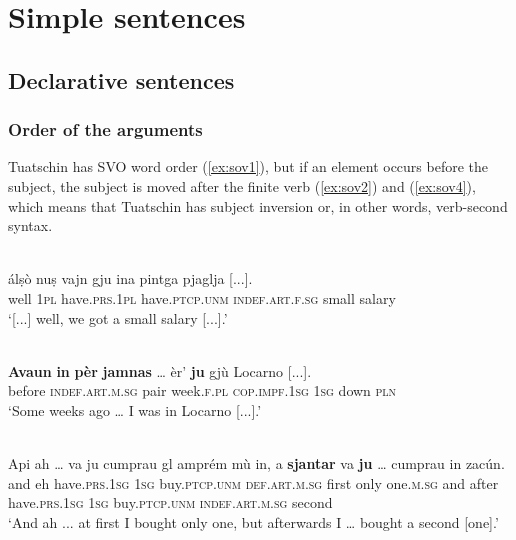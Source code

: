 \chapter{Simple sentences}

\section{Declarative sentences}


\subsection{Order of the arguments}
Tuatschin has SVO word order (\ref{ex:sov1}), but if an element occurs before the subject, the subject is moved after the finite verb (\ref{ex:sov2}) and (\ref{ex:sov4}), which means that Tuatschin has subject inversion or, in other words, verb-second syntax.

\ea
\label{ex:sov1}
\\
	\gll    [...] álṣò {\ob}nuṣ{\cb} {\ob}vajn gju{\cb} {\ob}ina pintga pjaglja{\cb} [...].\\
 {} well \textsc{1pl} have.\textsc{prs.1pl}  have.\textsc{ptcp.unm} \textsc{indef.art.f.sg} small salary \\
\glt `[...] well, we got a small salary [...].'
\z

\ea
\label{ex:sov2}
\\
\gll {\ob}\textbf{Avaun} \textbf{in} \textbf{pèr} \textbf{jamnas}{\cb} … èr’ {\ob}\textbf{ju}{\cb} gjù Locarno [...].\\
before \textsc{indef.art.m.sg} pair week.\textsc{f.pl} {} \textsc{cop.impf.1sg} \textsc{1sg} down \textsc{pln}\\
\glt `Some weeks ago … I was in Locarno [...].'
\z

\ea
\label{ex:sov4}
\\
\gll  Api ah … va ju cumprau gl amprém mù in, a {\ob}\textbf{sjantar}{\cb} va {\ob}{\textbf{ju}}{\cb} … cumprau in zacún.\\
and eh {} have.\textsc{prs.1sg} \textsc{1sg} buy.\textsc{ptcp.unm} \textsc{def.art.m.sg} first only one.\textsc{m.sg} and after  have.\textsc{prs.1sg} \textsc{1sg} {} buy.\textsc{ptcp.unm}  \textsc{indef.art.m.sg} second\\
\glt `And ah ... at first I bought only one, but afterwards I … bought a second [one].'
\z

